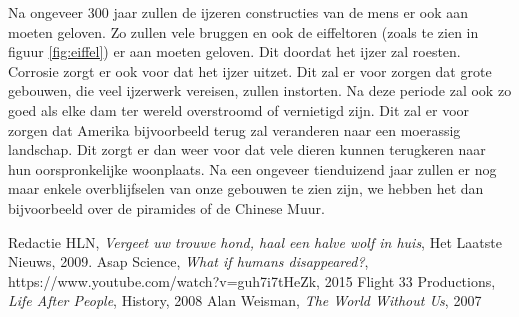\newline
Na ongeveer 300 jaar zullen de ijzeren constructies van de mens er ook aan moeten geloven. Zo zullen vele bruggen en ook de eiffeltoren (zoals te zien in figuur \ref{fig:eiffel}) er aan moeten geloven. Dit doordat het ijzer zal roesten. Corrosie zorgt er ook voor dat het ijzer uitzet. Dit zal er voor zorgen dat grote gebouwen, die veel ijzerwerk vereisen, zullen instorten. Na deze periode zal ook zo goed als elke dam ter wereld overstroomd of vernietigd zijn. Dit zal er voor zorgen dat Amerika bijvoorbeeld terug zal veranderen naar een moerassig landschap. Dit zorgt er dan weer voor dat vele dieren kunnen terugkeren naar hun oorspronkelijke woonplaats.
\newline
Na een ongeveer tienduizend jaar zullen er nog maar enkele overblijfselen van onze gebouwen te zien zijn, we hebben het dan bijvoorbeeld over de piramides of de Chinese Muur. \cite{LAPOutbreak}
\begin{thebibliography}{9}

  Redactie HLN,
  \emph{Vergeet uw trouwe hond, haal een halve wolf in huis},
  Het Laatste Nieuws,
  2009.
  Asap Science,
  \emph{What if humans disappeared?},
  https://www.youtube.com/watch?v=guh7i7tHeZk,
  2015
	Flight 33 Productions,
    \emph{Life After People},
    History,
    2008
	Alan Weisman,
	\emph{The World Without Us},
	2007
\end{thebibliography}


